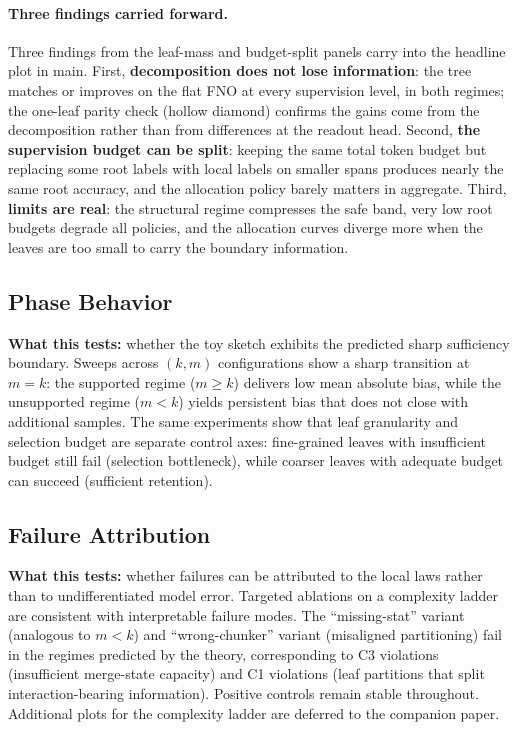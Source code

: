 \paragraph{Three findings carried forward.}
Three findings from the leaf-mass and budget-split panels carry into
the headline plot in main. First, \textbf{decomposition does not lose
information}: the tree matches or improves on the flat FNO at every
supervision level, in both regimes; the one-leaf parity check
(hollow diamond) confirms the gains come from the decomposition
rather than from differences at the readout head. Second, \textbf{the
supervision budget can be split}: keeping the same total token
budget but replacing some root labels with local labels on smaller
spans produces nearly the same root accuracy, and the allocation
policy barely matters in aggregate. Third, \textbf{limits are real}:
the structural regime compresses the safe band, very low root
budgets degrade all policies, and the allocation curves diverge more
when the leaves are too small to carry the boundary information.

\subsection{Phase Behavior}

\textbf{What this tests:} whether the toy sketch exhibits the predicted sharp sufficiency boundary. Sweeps across $(k,m)$ configurations show a sharp transition at $m = k$: the supported regime ($m \ge k$) delivers low mean absolute bias, while the unsupported regime ($m < k$) yields persistent bias that does not close with additional samples. The same experiments show that leaf granularity and selection budget are separate control axes: fine-grained leaves with insufficient budget still fail (selection bottleneck), while coarser leaves with adequate budget can succeed (sufficient retention).

\subsection{Failure Attribution}

\textbf{What this tests:} whether failures can be attributed to the local laws rather than to undifferentiated model error. Targeted ablations on a complexity ladder are consistent with interpretable failure modes. The ``missing-stat'' variant (analogous to $m < k$) and ``wrong-chunker'' variant (misaligned partitioning) fail in the regimes predicted by the theory, corresponding to C3 violations (insufficient merge-state capacity) and C1 violations (leaf partitions that split interaction-bearing information). Positive controls remain stable throughout. Additional plots for the complexity ladder are deferred to the companion paper.

